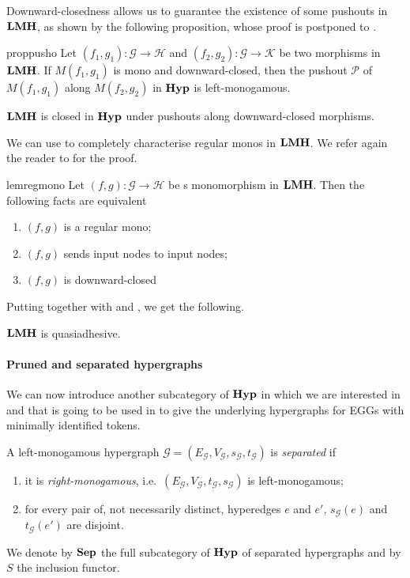 \documentclass[3p]{elsarticle}
\newcommand{\catname}[1]{\textbf{\textup{#1}}}
\newcommand{\lmo}{\catname{LMH}}
\newcommand{\hyp}{\catname{Hyp}}
\newcommand{\shyp}{\catname{Sep}}
\theoremstyle{remark}
\theoremstyle{definition}
\begin{document}
Downward-closedness allows us to guarantee the existence of some pushouts in $\lmo$, as shown by the following proposition, whose proof is postponed to . 
\begin{restatable}{prop}{pusho}\label{prop:pusho}
Let $(f_1,g_1)\colon \mathcal{G}\to \mathcal{H}$ and $(f_2, g_2)\colon \mathcal{G}\to \mathcal{K}$ be two morphisms in $\lmo$. If $M(f_1,g_1)$ is mono and downward-closed, then the pushout $\mathcal{P}$ of $M(f_1,g_1)$ along $M(f_2, g_2)$ in $\hyp$ is left-monogamous.
\end{restatable}

\begin{cor}\label{cor:pusho}
	$\lmo$ is closed in $\hyp$ under pushouts along downward-closed morphisms.
\end{cor}

We can use  to completely characterise regular monos in $\lmo$. We refer again the reader to  for the proof.

\begin{restatable}{lem}{regmono}\label{lem:regmon}
	Let $(f,g)\colon \mathcal{G}\to \mathcal{H}$ be s monomorphism in $\lmo$.
Then the following facts are equivalent
 	\begin{enumerate}
		\item $(f,g)$ is a regular mono;
		\item $(f,g)$ sends input nodes to input nodes;
		\item $(f,g)$ is downward-closed
	\end{enumerate}
\end{restatable}

Putting together  with   and , we get the following.

\begin{cor}\label{cor:lmquasi}$\lmo$ is quasiadhesive.
\end{cor}


\paragraph{Pruned and separated hypergraphs}
We can now introduce another  subcategory of $\hyp$ in which we are interested in and that is going to be used in  to give the underlying hypergraphs for EGGs with minimally identified tokens.

\begin{defi}  A left-monogamous hypergraph $\mathcal{G}=(E_{\mathcal{G}}, V_{\mathcal{G}}, s_{\mathcal{G}}, t_{\mathcal{G}})$ is \emph{separated} if
	\begin{enumerate}
	\item it is \emph{right-monogamous}, i.e.~$(E_{\mathcal{G}}, V_{\mathcal{G}}, t_{\mathcal{G}}, s_{\mathcal{G}})$ is left-monogamous;
	\item for every pair of, not necessarily distinct, hyperedges $e$ and $e'$,  $s_{\mathcal{G}}(e)$ and $t_{\mathcal{G}}(e')$ are disjoint.
	\end{enumerate}
We denote by $\shyp$ the full subcategory of $\hyp$ of separated hypergraphs and by $S$ the inclusion functor.
\end{defi}
\end{document}
